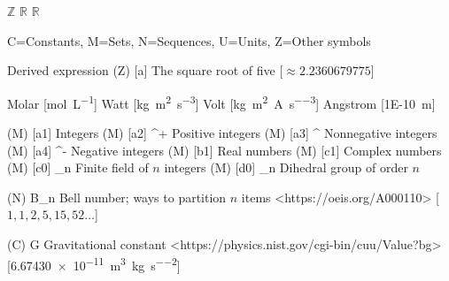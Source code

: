
\DeclareMathOperator{\indicator} {\mathbf{1}}
\DeclareMathOperator{\mean} {mean}
\DeclareMathOperator{\std} {std}
\DeclareMathOperator{\sgn} {sgn}
\NewDocumentCommand \Z {} { \ensuremath{\mathbb{Z}} }
\NewDocumentCommand \R {} { \ensuremath{\mathbb{R}} }
\NewDocumentCommand \C {} { \ensuremath{\mathbb{R}} }

\DeclareSIQualifier{}  %
\DeclareSIQualifier{}
\DeclareSIUnit{}
\DeclareSIUnit{}
\DeclareSIUnit{}
\DeclareSIUnit\angstrom{\AA}



\SetNomGroups
{
    C=Constants,
    M=Sets,
    N=Sequences,
    U=Units,
    Z=Other symbols
}



     {Derived expression}
\NomMath (Z) [a] {} {The square root of five} [$\approx 2.2360679775$]

 {Molar} [\unit{\mol\per\liter}]
 {Watt} [\unit{\kilogram \meter \squared \per \second \cubed}]
 {Volt} [\unit{\kilogram \meter \squared \per \ampere \per \second \cubed}]
\NomUnit {\AA} {Angstrom} [\qty{1E-10}{\meter}]

\NomMath (M) [a1] {\Z} {Integers}
\NomMath (M) [a2] {\Z^+} {Positive integers}
\NomMath (M) [a3] {\Z^{}} {Nonnegative integers}
\NomMath (M) [a4] {\Z^-} {Negative integers}
\NomMath (M) [b1] {\Z} {Real numbers}
\NomMath (M) [c1] {\C} {Complex numbers}
\NomMath (M) [c0] {\Z_n} {Finite field of $n$ integers}
\NomMath (M) [d0] {_n} {Dihedral group of order $n$}


\NomMath (N) {B_n} {Bell number; ways to partition $n$ items}
    <https://oeis.org/A000110>
    [{$1, 1, 2, 5, 15, 52 \ldots$}]

\NomMath (C) {G} {Gravitational constant}
    <https://physics.nist.gov/cgi-bin/cuu/Value?bg>
    [\qty{6.67430e-11}{\meter\cubed\per\kilogram\per\second\squared}]

